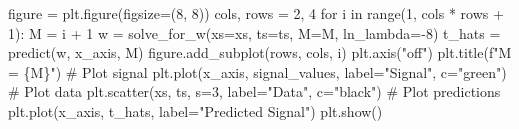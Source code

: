 \documentclass[
  0.875em,
  letterpaper,
  DIV=11,
  numbers=noendperiod]{scrartcl}
\newenvironment{Shaded}{\begin{snugshade}}{\end{snugshade}}
\newcommand{\BuiltInTok}[1]{\textcolor[rgb]{0.00,0.23,0.31}{#1}}
\newcommand{\CommentTok}[1]{\textcolor[rgb]{0.37,0.37,0.37}{#1}}
\newcommand{\ControlFlowTok}[1]{\textcolor[rgb]{0.00,0.23,0.31}{#1}}
\newcommand{\DecValTok}[1]{\textcolor[rgb]{0.68,0.00,0.00}{#1}}
\newcommand{\KeywordTok}[1]{\textcolor[rgb]{0.00,0.23,0.31}{#1}}
\newcommand{\NormalTok}[1]{\textcolor[rgb]{0.00,0.23,0.31}{#1}}
\newcommand{\OperatorTok}[1]{\textcolor[rgb]{0.37,0.37,0.37}{#1}}
\newcommand{\SpecialCharTok}[1]{\textcolor[rgb]{0.37,0.37,0.37}{#1}}
\newcommand{\SpecialStringTok}[1]{\textcolor[rgb]{0.13,0.47,0.30}{#1}}
\newcommand{\StringTok}[1]{\textcolor[rgb]{0.13,0.47,0.30}{#1}}
\begin{document}
\begin{Shaded}
\begin{Highlighting}[]
\NormalTok{figure }\OperatorTok{=}\NormalTok{ plt.figure(figsize}\OperatorTok{=}\NormalTok{(}\DecValTok{8}\NormalTok{, }\DecValTok{8}\NormalTok{))}
\NormalTok{cols, rows }\OperatorTok{=} \DecValTok{2}\NormalTok{, }\DecValTok{4}
\ControlFlowTok{for}\NormalTok{ i }\KeywordTok{in} \BuiltInTok{range}\NormalTok{(}\DecValTok{1}\NormalTok{, cols }\OperatorTok{*}\NormalTok{ rows }\OperatorTok{+} \DecValTok{1}\NormalTok{):}
\NormalTok{    M }\OperatorTok{=}\NormalTok{ i }\OperatorTok{+} \DecValTok{1}
\NormalTok{    w }\OperatorTok{=}\NormalTok{ solve\_for\_w(xs}\OperatorTok{=}\NormalTok{xs, ts}\OperatorTok{=}\NormalTok{ts, M}\OperatorTok{=}\NormalTok{M, ln\_lambda}\OperatorTok{={-}}\DecValTok{8}\NormalTok{)}
\NormalTok{    t\_hats }\OperatorTok{=}\NormalTok{ predict(w, x\_axis, M)}
\NormalTok{    figure.add\_subplot(rows, cols, i)}
\NormalTok{    plt.axis(}\StringTok{"off"}\NormalTok{)}
\NormalTok{    plt.title(}\SpecialStringTok{f"M = }\SpecialCharTok{\{}\NormalTok{M}\SpecialCharTok{\}}\SpecialStringTok{"}\NormalTok{)}
    \CommentTok{\# Plot signal}
\NormalTok{    plt.plot(x\_axis, signal\_values, label}\OperatorTok{=}\StringTok{"Signal"}\NormalTok{, c}\OperatorTok{=}\StringTok{"green"}\NormalTok{)}
    \CommentTok{\# Plot data}
\NormalTok{    plt.scatter(xs, ts, s}\OperatorTok{=}\DecValTok{3}\NormalTok{, label}\OperatorTok{=}\StringTok{"Data"}\NormalTok{, c}\OperatorTok{=}\StringTok{"black"}\NormalTok{)}
    \CommentTok{\# Plot predictions}
\NormalTok{    plt.plot(x\_axis, t\_hats, label}\OperatorTok{=}\StringTok{"Predicted Signal"}\NormalTok{)}
\NormalTok{plt.show()}
\end{Highlighting}
\end{Shaded}
\end{document}

